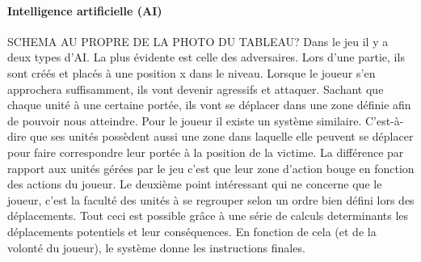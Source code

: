 \documentclass[a4paper,10pt]{article}
\begin{document}
  \paragraph{Intelligence artificielle (AI)}
  SCHEMA AU PROPRE DE LA PHOTO DU TABLEAU?
  Dans le jeu il y a deux types d'AI. La plus évidente est celle des adversaires. Lors d'une partie, ils sont créés et placés à une position x dans le niveau. Lorsque le joueur s'en approchera suffisamment, ils vont devenir agressifs et attaquer. Sachant que chaque unité à une certaine portée, ils vont se déplacer dans une zone définie afin de pouvoir nous atteindre.
  \newline Pour le joueur il existe un système similaire. C'est-à-dire que ses unités possèdent aussi une zone dans laquelle elle peuvent se déplacer pour faire correspondre leur portée à la position de la victime. La différence par rapport aux unités gérées par le jeu c'est que leur zone d'action bouge en fonction des actions du joueur.
  \newline Le deuxième point intéressant qui ne concerne que le joueur, c'est la faculté des unités à se regrouper selon un ordre bien défini lors des déplacements.
  \newline Tout ceci est possible grâce à une série de calculs determinants les déplacements potentiels et leur conséquences. En fonction de cela (et de la volonté du joueur), le système donne les instructions finales.
  
\end{document}
